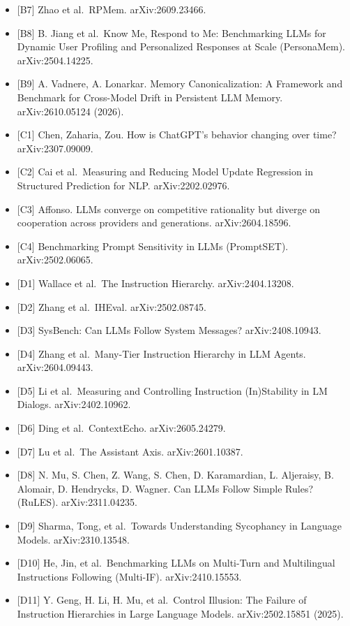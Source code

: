 \documentclass[10pt]{article}
\begin{document}
\begin{itemize}
\item
  {[}B7{]} Zhao et al.~RPMem. arXiv:2609.23466.
\item
  {[}B8{]} B. Jiang et al.~Know Me, Respond to Me: Benchmarking LLMs for Dynamic User Profiling and Personalized Responses at Scale (PersonaMem). arXiv:2504.14225.
\item
  {[}B9{]} A. Vadnere, A. Lonarkar. Memory Canonicalization: A Framework and Benchmark for Cross-Model Drift in Persistent LLM Memory. arXiv:2610.05124 (2026).
\item
  {[}C1{]} Chen, Zaharia, Zou. How is ChatGPT's behavior changing over time? arXiv:2307.09009.
\item
  {[}C2{]} Cai et al.~Measuring and Reducing Model Update Regression in Structured Prediction for NLP. arXiv:2202.02976.
\item
  {[}C3{]} Affonso. LLMs converge on competitive rationality but diverge on cooperation across providers and generations. arXiv:2604.18596.
\item
  {[}C4{]} Benchmarking Prompt Sensitivity in LLMs (PromptSET). arXiv:2502.06065.
\item
  {[}D1{]} Wallace et al.~The Instruction Hierarchy. arXiv:2404.13208.
\item
  {[}D2{]} Zhang et al.~IHEval. arXiv:2502.08745.
\item
  {[}D3{]} SysBench: Can LLMs Follow System Messages? arXiv:2408.10943.
\item
  {[}D4{]} Zhang et al.~Many-Tier Instruction Hierarchy in LLM Agents. arXiv:2604.09443.
\item
  {[}D5{]} Li et al.~Measuring and Controlling Instruction (In)Stability in LM Dialogs. arXiv:2402.10962.
\item
  {[}D6{]} Ding et al.~ContextEcho. arXiv:2605.24279.
\item
  {[}D7{]} Lu et al.~The Assistant Axis. arXiv:2601.10387.
\item
  {[}D8{]} N. Mu, S. Chen, Z. Wang, S. Chen, D. Karamardian, L. Aljeraisy, B. Alomair, D. Hendrycks, D. Wagner. Can LLMs Follow Simple Rules? (RuLES). arXiv:2311.04235.
\item
  {[}D9{]} Sharma, Tong, et al.~Towards Understanding Sycophancy in Language Models. arXiv:2310.13548.
\item
  {[}D10{]} He, Jin, et al.~Benchmarking LLMs on Multi-Turn and Multilingual Instructions Following (Multi-IF). arXiv:2410.15553.
\item
  {[}D11{]} Y. Geng, H. Li, H. Mu, et al.~Control Illusion: The Failure of Instruction Hierarchies in Large Language Models. arXiv:2502.15851 (2025).

\end{itemize}
\end{document}
